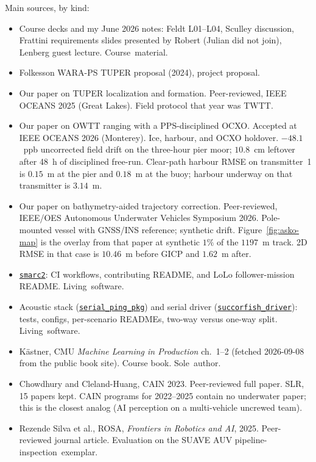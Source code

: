 \documentclass[11pt,a4paper,twocolumn]{amsart}
\begin{document}
Main sources, by kind:
{\raggedright
\setlength{\leftmargini}{1.1em}
\begin{itemize}
\item Course decks and my June 2026 notes: Feldt L01--L04, Sculley discussion, Frattini requirements slides presented by Robert (Julian did not join), Lenberg guest lecture. \mbox{Course material.}
\item Folkesson WARA-PS TUPER proposal (2024), project proposal.
\item Our paper on TUPER localization and formation. Peer-reviewed, IEEE OCEANS 2025 (Great Lakes). Field protocol that year was TWTT.
\item Our paper on OWTT ranging with a PPS-disciplined OCXO. Accepted at IEEE OCEANS 2026 (Monterey). Ice, harbour, and OCXO holdover. $-48.1$~ppb uncorrected field drift on the three-hour pier moor; $10.8$~cm leftover after 48~h of disciplined free-run. Clear-path harbour RMSE on transmitter~1 is $0.15$~m at the pier and $0.18$~m at the buoy; harbour underway on that transmitter is $3.14$~m.
\item Our paper on bathymetry-aided trajectory correction. Peer-reviewed, IEEE/OES Autonomous Underwater Vehicles Symposium 2026. Pole-mounted vessel with GNSS/INS reference; synthetic drift. Figure~\ref{fig:asko-map} is the overlay from that paper at synthetic $1\%$ of the $1197$~m track. 2D RMSE in that case is $10.46$~m before GICP and $1.62$~m after.
\item \href{https://github.com/smarc-project/smarc2}{\texttt{smarc2}}: CI workflows, contributing README, and LoLo follower-mission README. \mbox{Living software.}
\item Acoustic stack (\href{https://github.com/NinjaTuna007/serial_ping_pkg}{\texttt{serial\_ping\_pkg}}) and serial driver (\href{https://github.com/NinjaTuna007/succorfish_driver}{\texttt{succorfish\_driver}}): tests, configs, per-scenario READMEs, two-way versus one-way split. \mbox{Living software.}
\item K\"{a}stner, CMU \emph{Machine Learning in Production} ch.~1--2 (fetched 2026-09-08 from the public book site). Course book. \mbox{Sole author.}
\item Chowdhury and Cleland-Huang, CAIN 2023. Peer-reviewed full paper. SLR, 15 papers kept. CAIN programs for 2022--2025 contain no underwater paper; this is the closest analog (AI perception on a multi-vehicle uncrewed team).
\item Rezende Silva et al., ROSA, \emph{Frontiers in Robotics and AI}, 2025. Peer-reviewed journal article. Evaluation on the SUAVE AUV \mbox{pipeline-inspection exemplar.}
\end{itemize}}
\end{document}
